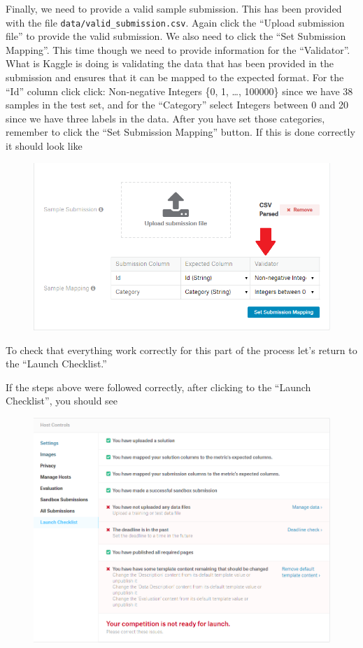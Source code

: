 \documentclass{article}
\begin{document}
Finally, we need to provide a valid sample submission. This has been
provided with the file \texttt{data/valid\_submission.csv}. Again click
the ``Upload submission file'' to provide the valid submission. We also
need to click the ``Set Submission Mapping''. This time though we need
to provide information for the ``Validator''. What is Kaggle is doing is
validating the data that has been provided in the submission and ensures
that it can be mapped to the expected format. For the ``Id'' column
click click: Non-negative Integers \{0, 1, \ldots{}, 100000\} since we
have 38 samples in the test set, and for the ``Category'' select
Integers between 0 and 20 since we have three labels in the data. After
you have set those categories, remember to click the ``Set Submission
Mapping'' button. If this is done correctly it should look like

\begin{figure}[H]
    \centering
    \includegraphics[width=\linewidth]{figures/submission-mapping.PNG}
\end{figure}

To check that everything work correctly for this part of the process
let's return to the ``Launch Checklist.''

If the steps above were followed correctly, after clicking to the
``Launch Checklist'', you should see

\begin{figure}[H]
    \centering
    \includegraphics[width=\linewidth]{figures/launch-checklist-post-evaluation.PNG}
\end{figure}
\end{document}
